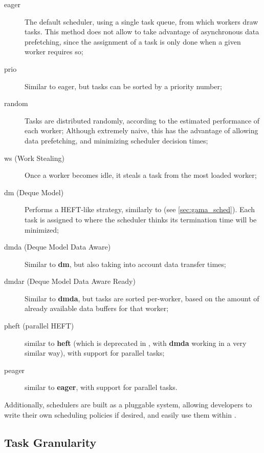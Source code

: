 \documentclass[main.tex]{subfiles}
\begin{document}
\begin{description}

\item[eager] The default scheduler, using a single task queue, from which workers draw tasks. This method does not allow to take advantage of asynchronous data prefetching, since the assignment of a task is only done when a given worker requires so;

\item[prio] Similar to eager, but tasks can be sorted by a priority number;

\item[random] Tasks are distributed randomly, according to the estimated performance of each worker; Although extremely naive, this has the advantage of allowing data prefetching, and minimizing scheduler decision times;

\item[ws (Work Stealing)] Once a worker becomes idle, it steals a task from the most loaded worker;

\item[dm (Deque Model)] Performs a HEFT-like strategy, similarly to \gama (see \cref{sec:gama_sched}). Each task is assigned to where the scheduler thinks its termination time will be minimized;

\item[dmda (Deque Model Data Aware)] Similar to \textbf{dm}, but also taking into account data transfer times;

\item[dmdar (Deque Model Data Aware Ready)] Similar to \textbf{dmda}, but tasks are sorted per-worker, based on the amount of already available data buffers for that worker;

\item[pheft (parallel HEFT)] similar to \textbf{heft} (which is deprecated in \starpu, with \textbf{dmda} working in a very similar way), with support for parallel tasks;

\item[peager] similar to \textbf{eager}, with support for parallel tasks.

\end{description}

Additionally, schedulers are built as a pluggable system, allowing developers to write their own scheduling policies if desired, and easily use them within \starpu.


\subsection{Task Granularity}
\end{document}
